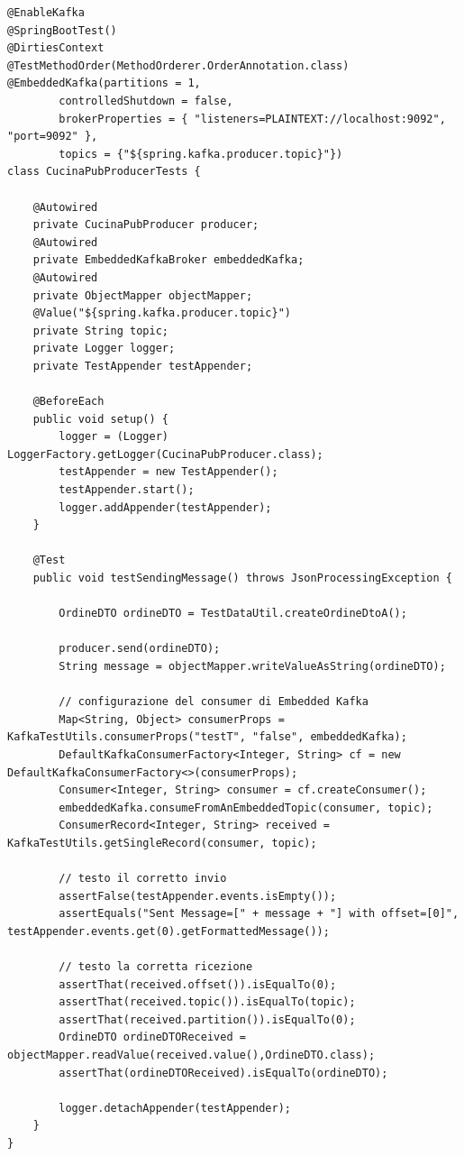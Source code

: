 \begin{lstlisting}[style=myJava, 
    caption={Test di integrazione per il producer CucinaPubProducer}, label=lst:CucinaPubProducerTest, 
    emph={[2] kafkaTemplate , objectMapper, topic, payload, log, producer, embeddedKafka, logger, testAppender },
    emphstyle={[2]\color{codeDarkMagenta}},
    emph={[3] setup, testSendingMessage },
    emphstyle={[3]\color{codeCyan}}]
@EnableKafka
@SpringBootTest()
@DirtiesContext
@TestMethodOrder(MethodOrderer.OrderAnnotation.class)
@EmbeddedKafka(partitions = 1,
        controlledShutdown = false,
        brokerProperties = { "listeners=PLAINTEXT://localhost:9092", "port=9092" },
        topics = {"${spring.kafka.producer.topic}"})
class CucinaPubProducerTests {

    @Autowired
    private CucinaPubProducer producer;
    @Autowired
    private EmbeddedKafkaBroker embeddedKafka;
    @Autowired
    private ObjectMapper objectMapper;
    @Value("${spring.kafka.producer.topic}")
    private String topic;
    private Logger logger;
    private TestAppender testAppender;

    @BeforeEach
    public void setup() {
        logger = (Logger) LoggerFactory.getLogger(CucinaPubProducer.class);
        testAppender = new TestAppender();
        testAppender.start();
        logger.addAppender(testAppender);
    }

    @Test
    public void testSendingMessage() throws JsonProcessingException {

        OrdineDTO ordineDTO = TestDataUtil.createOrdineDtoA();

        producer.send(ordineDTO);
        String message = objectMapper.writeValueAsString(ordineDTO);

        // configurazione del consumer di Embedded Kafka
        Map<String, Object> consumerProps = KafkaTestUtils.consumerProps("testT", "false", embeddedKafka);
        DefaultKafkaConsumerFactory<Integer, String> cf = new DefaultKafkaConsumerFactory<>(consumerProps);
        Consumer<Integer, String> consumer = cf.createConsumer();
        embeddedKafka.consumeFromAnEmbeddedTopic(consumer, topic);
        ConsumerRecord<Integer, String> received = KafkaTestUtils.getSingleRecord(consumer, topic);

        // testo il corretto invio
        assertFalse(testAppender.events.isEmpty());
        assertEquals("Sent Message=[" + message + "] with offset=[0]", testAppender.events.get(0).getFormattedMessage());

        // testo la corretta ricezione
        assertThat(received.offset()).isEqualTo(0);
        assertThat(received.topic()).isEqualTo(topic);
        assertThat(received.partition()).isEqualTo(0);
        OrdineDTO ordineDTOReceived = objectMapper.readValue(received.value(),OrdineDTO.class);
        assertThat(ordineDTOReceived).isEqualTo(ordineDTO);

        logger.detachAppender(testAppender);
    }
}
\end{lstlisting}

